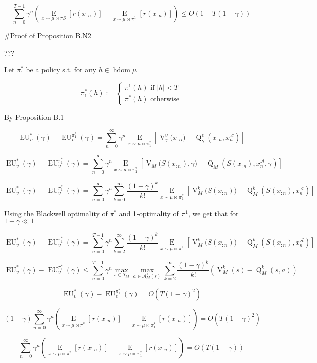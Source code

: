 \documentclass[a4paper]{article}
\newcommand{\AP}[1]{\left(#1\right)}
\newcommand{\AB}[1]{\left[#1\right]}
\newcommand{\E}[1]{\underset{#1}{\operatorname{E}}}
\newcommand{\Ea}[2]{\underset{#1}{\operatorname{E}}\AB{#2}}
\newcommand{\Abs}[1]{\left\vert #1 \right\vert}
\newcommand{\A}{\mathcal{A}}
\newcommand{\St}{\mathcal{S}}
\DeclareMathOperator{\HD}{hdom}
\newcommand{\V}{\operatorname{V}}
\newcommand{\Q}{\operatorname{Q}}
\newcommand{\EU}{\operatorname{EU}}
\begin{document}
$$\sum_{n=0}^{T-1} \gamma^n \left(\E{x \sim \mu\bowtie\pi S}\left[r\left(x_{:n}\right)\right]-\E{x \sim \mu\bowtie\pi^1}\left[r\left(x_{:n}\right)\right]\right) \leq O\left(1 + T\left(1-\gamma\right)\right)$$

\#Proof of Proposition B.N2

???

Let $\pi^*_1$ be a policy s.t. for any $h \in \HD{\mu}$

$$\pi^*_1(h):=\begin{cases} \pi^1(h) \text{ if } \Abs{h} < T \\ \pi^*(h) \text{ otherwise} \end{cases}$$

By Proposition B.1

$$\EU_{\upsilon}^{*}(\gamma) - \EU_{\upsilon}^{\pi^*_1}(\gamma) = \sum_{n=0}^\infty{\gamma^n \Ea{x\sim\mu\bowtie\pi^*_1}{\V^{\upsilon}_\gamma\Big(x_{:n}\Big)-\Q^{\upsilon}_\gamma\AP{x_{:n},x_n^\A}}}$$

$$\EU_{\upsilon}^{*}(\gamma) - \EU_{\upsilon}^{\pi^*_1}(\gamma) = \sum_{n=0}^\infty{\gamma^n \Ea{x\sim\mu\bowtie\pi^*_1}{\V_M\Big(S\AP{x_{:n}},\gamma\Big)-\Q_M\AP{S\AP{x_{:n}},x_n^\A,\gamma}}}$$

$$\EU_{\upsilon}^{*}(\gamma) - \EU_{\upsilon}^{\pi^*_1}(\gamma) = \sum_{n=0}^\infty{\gamma^n \sum_{k=0}^\infty{\frac{(1-\gamma)^k}{k!} \Ea{x\sim\mu\bowtie\pi^*_1}{\V_M^k\Big(S\AP{x_{:n}}\Big)-\Q_M^k\AP{S\AP{x_{:n}},x_n^\A}}}}$$

Using the Blackwell optimality of $\pi^*$ and 1-optimality of $\pi^1$, we get that for $1-\gamma \ll 1$

$$\EU_{\upsilon}^{*}(\gamma) - \EU_{\upsilon}^{\pi^*_1}(\gamma) = \sum_{n=0}^{T-1}{\gamma^n \sum_{k=2}^\infty{\frac{(1-\gamma)^k}{k!} \Ea{x\sim\mu\bowtie\pi^1}{\V_M^k\Big(S\AP{x_{:n}}\Big)-\Q_M^k\AP{S\AP{x_{:n}},x_n^\A}}}}$$

$$\EU_{\upsilon}^{*}(\gamma) - \EU_{\upsilon}^{\pi^*_1}(\gamma) \leq \sum_{n=0}^{T-1}{\gamma^n \max_{s \in \St_M} \max_{a \in \A_M^1(s)} \sum_{k=2}^\infty{\frac{(1-\gamma)^k}{k!} \AP{\V_M^k(s)-\Q_M^k\AP{s,a}}}}$$

$$\EU_{\upsilon}^{*}(\gamma) - \EU_{\upsilon}^{\pi^*_1}(\gamma) = O\AP{T(1-\gamma)^2}$$

$$(1-\gamma)\sum_{n=0}^{\infty} \gamma^n \left(\E{x \sim \mu\bowtie\pi^*}\left[r\left(x_{:n}\right)\right]-\E{x \sim \mu\bowtie\pi^*_1}\left[r\left(x_{:n}\right)\right]\right) = O\AP{T(1-\gamma)^2}$$

$$\sum_{n=0}^{\infty} \gamma^n \left(\E{x \sim \mu\bowtie\pi^*}\left[r\left(x_{:n}\right)\right]-\E{x \sim \mu\bowtie\pi^*_1}\left[r\left(x_{:n}\right)\right]\right) = O\AP{T(1-\gamma)}$$
\end{document}
